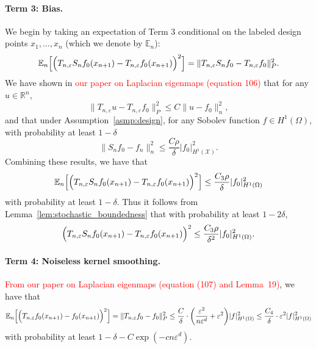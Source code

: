\documentclass{article}
\newcommand{\Reals}{\mathbb{R}}
\newcommand{\1}{\mathbf{1}}
\newcommand{\mc}[1]{\mathcal{#1}}
\newcommand{\Ebb}{\mathbb{E}}
\theoremstyle{alden}
\theoremstyle{aldenthm}
\theoremstyle{definition}
\theoremstyle{remark}
\begin{document}
\paragraph{Term 3: Bias.}
We begin by taking an expectation of Term 3 conditional on the labeled design points $x_1,\ldots,x_n$ (which we denote by $\Ebb_n$):
\begin{equation*}
\Ebb_n\Bigl[\Bigl(T_{n,\varepsilon}S_nf_0(x_{n + 1}) - T_{n,\varepsilon}f_0(x_{n + 1})\Bigr)^2\Bigr] = \|T_{n,\varepsilon}S_nf_0 - T_{n,\varepsilon}f_0\|_P^2.
\end{equation*}
We have shown in \textcolor{red}{our paper on Laplacian eigenmaps (equation 106)} that for any $u \in \Reals^n$,
\begin{equation*}
\|T_{n,\varepsilon}u - T_{n,\varepsilon}f_0\|_P^2 \leq C \|u - f_0\|_n^2,
\end{equation*}
and that under Assumption~\ref{asmp:design}, for any Sobolev function $f \in H^1(\Omega)$, with probability at least $1 - \delta$
\begin{equation*}
\|S_nf_0 -f_n\|_n^2 \leq \frac{C\rho}{\delta}|f_0|_{H^1(\mc{X})}^2.
\end{equation*}
Combining these results, we have that
\begin{equation*}
\Ebb_n\Bigl[\Bigl(T_{n,\varepsilon}S_nf_0(x_{n + 1}) - T_{n,\varepsilon}f_0(x_{n + 1})\Bigr)^2\Bigr] \leq \frac{C_3\rho}{\delta}|f_0|_{H^1(\Omega)}^2
\end{equation*}                                                                          
with probability at least $1 - \delta$. Thus it follows from Lemma~\ref{lem:stochastic_boundedness} that with probability at least $1 - 2\delta$,
\begin{equation*}
\Bigl(T_{n,\varepsilon}S_nf_0(x_{n + 1}) - T_{n,\varepsilon}f_0(x_{n + 1})\Bigr)^2 \leq \frac{C_3\rho}{\delta^2}|f_0|_{H^1(\Omega)}^2.
\end{equation*}
              
\paragraph{Term 4: Noiseless kernel smoothing.}
\textcolor{red}{From our paper on Laplacian eigenmaps (equation (107) and Lemma~19)}, we have that
\begin{equation*}
\Ebb_n\Bigl[\Bigl(T_{n,\varepsilon}f_0(x_{n + 1}) - f_0(x_{n + 1})\Bigr)^2\Bigr] = \|T_{n,\varepsilon}f_0 - f_0\|_P^2 \leq \frac{C}{\delta} \cdot \biggl(\frac{\varepsilon^2}{n\varepsilon^d} + \varepsilon^2\biggr) |f|_{H^1(\Omega)}^2 \leq \frac{C_4}{\delta} \cdot \varepsilon^2 |f|_{H^1(\Omega)}^2
\end{equation*}
with probability at least $1 - \delta - C\exp(-cn\varepsilon^d)$. 
\end{document}
